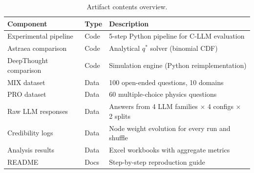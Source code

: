 \begin{table}[t]
\centering
\caption{Artifact contents overview.}
\label{tab:contents}
\footnotesize
\begin{tabular}{lll}
\toprule
\textbf{Component} & \textbf{Type} & \textbf{Description} \\
\midrule
Experimental pipeline  & Code & 5-step Python pipeline for C-LLM evaluation \\
Astraea comparison     & Code & Analytical $q^*$ solver (binomial CDF) \\
DeepThought comparison & Code & Simulation engine (Python reimplementation) \\
MIX dataset            & Data & 100 open-ended questions, 10 domains \\
PRO dataset            & Data & 60 multiple-choice physics questions \\
Raw LLM responses      & Data & Answers from 4 LLM families $\times$ 4 configs $\times$ 2 splits \\
Credibility logs       & Data & Node weight evolution for every run and shuffle \\
Analysis results       & Data & Excel workbooks with aggregate metrics \\
README                 & Docs & Step-by-step reproduction guide \\
\bottomrule
\end{tabular}
\end{table}
